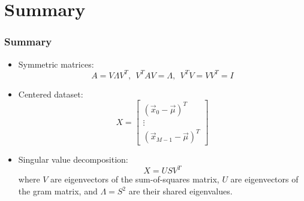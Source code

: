\documentclass{beamer}
\begin{document}
\section[Summary]{Summary}
\setcounter{subsection}{1}

\begin{frame}
  \frametitle{Summary}
  \begin{itemize}
  \item Symmetric matrices:
    \[
    A=V\Lambda V^T,~~V^TAV=\Lambda,~~V^TV=VV^T=I
    \]
  \item Centered dataset:
    \[
    X = \left[\begin{array}{c}(\vec{x}_0-\vec\mu)^T\\\vdots\\(\vec{x}_{M-1}-\vec\mu)^T\end{array}\right]
    \]
  \item Singular value decomposition:
    \[
    X = USV^T
    \]
    where $V$ are eigenvectors of the sum-of-squares matrix, $U$ are
    eigenvectors of the gram matrix, and $\Lambda=S^2$ are their
    shared eigenvalues.
  \end{itemize}
\end{frame}
\end{document}
